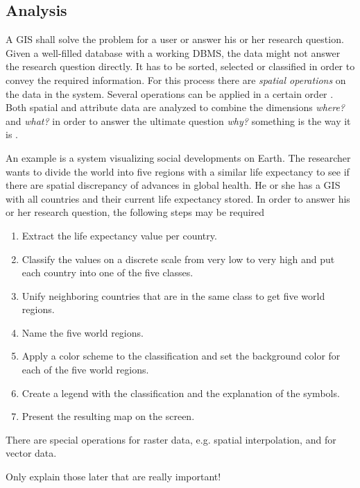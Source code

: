 \subsection{Analysis} %
\label{sub:analysis}

A GIS shall solve the problem for a user or answer his or her research question. Given a well-filled database with a working DBMS, the data might not answer the research question directly. It has to be sorted, selected or classified in order to convey the required information. For this process there are \emph{spatial operations} on the data in the system. Several operations can be applied in a certain order
\cite[pp. 321-325]{bolstad2008gis}.
Both spatial and attribute data are analyzed to combine the dimensions \emph{where?} and \emph{what?} in order to answer the ultimate question \emph{why?} something is the way it is
\cite[p.xii-xvi]{knowles2002past}.

An example is a system visualizing social developments on Earth. The researcher wants to divide the world into five regions with a similar life expectancy to see if there are spatial discrepancy of advances in global health. He or she has a GIS with all countries and their current life expectancy stored. In order to answer his or her research question, the following steps may be required

\begin{enumerate}
  \item Extract the life expectancy value per country.
  \item Classify the values on a discrete scale from very low to very high and put each country into one of the five classes.
  \item Unify neighboring countries that are in the same class to get five world regions.
  \item Name the five world regions.
  \item Apply a color scheme to the classification and set the background color for each of the five world regions.
  \item Create a legend with the classification and the explanation of the symbols.
  \item Present the resulting map on the screen.
\end{enumerate}

There are special operations for raster data, e.g. spatial interpolation, and for vector data.

Only explain those later that are really important!

